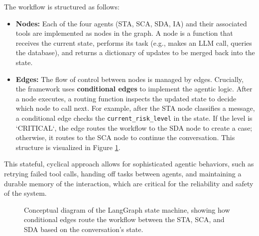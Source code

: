 The workflow is structured as follows:
\begin{itemize}
    \item \textbf{Nodes:} Each of the four agents (STA, SCA, SDA, IA) and their associated tools are implemented as nodes in the graph. A node is a function that receives the current state, performs its task (e.g., makes an LLM call, queries the database), and returns a dictionary of updates to be merged back into the state.
    \item \textbf{Edges:} The flow of control between nodes is managed by edges. Crucially, the framework uses \textbf{conditional edges} to implement the agentic logic. After a node executes, a routing function inspects the updated state to decide which node to call next. For example, after the STA node classifies a message, a conditional edge checks the \texttt{current\_risk\_level} in the state. If the level is `CRITICAL`, the edge routes the workflow to the SDA node to create a case; otherwise, it routes to the SCA node to continue the conversation. This structure is visualized in Figure \ref{fig:langgraph_conceptual}.
\end{itemize}

This stateful, cyclical approach allows for sophisticated agentic behaviors, such as retrying failed tool calls, handing off tasks between agents, and maintaining a durable memory of the interaction, which are critical for the reliability and safety of the system.

\begin{figure}[h]
    \centering
    \caption{Conceptual diagram of the LangGraph state machine, showing how conditional edges route the workflow between the STA, SCA, and SDA based on the conversation's state.}
    \label{fig:langgraph_conceptual}
\end{figure}

